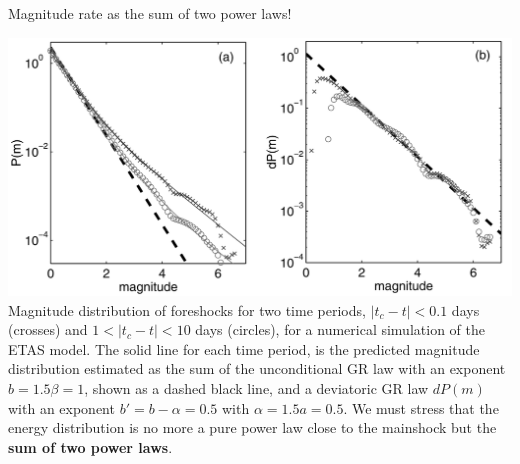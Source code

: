 \documentclass[aspectratio=43,9pt]{beamer}
\begin{document}
\begin{frame}
 {Magnitude rate as the sum of two power laws!}
 
   \includegraphics[width=0.8\linewidth]{Figs/fig7} \\
  Magnitude distribution of foreshocks for two time periods, $|t_c - t| < 0.1$ days 
  (crosses) and $1 < |t_c - t| < 10$ days (circles), for a numerical simulation of 
  the ETAS model. The solid line for each time period, is the predicted magnitude 
  distribution estimated as the sum of the unconditional GR law with an exponent 
  $b = 1.5\beta = 1$, shown as a dashed black line, and a deviatoric GR law $dP(m)$
  with an exponent $b' = b - \alpha = 0.5$ with $\alpha = 1.5a = 0.5$. 
  We must stress that the energy distribution is no more a pure power law close 
  to the mainshock but the {\bf sum of two power laws}.

 
\end{frame}
\end{document}
